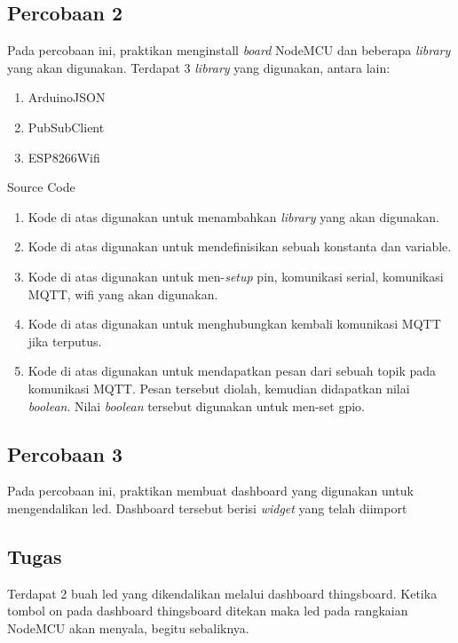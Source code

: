 \documentclass{class}
\begin{document}
    \subsection{Percobaan 2}
    Pada percobaan ini, praktikan menginstall \emph{board} NodeMCU dan beberapa \emph{library} yang akan digunakan.
    Terdapat 3 \emph{library} yang digunakan, antara lain:
    \begin{enumerate}
      \item ArduinoJSON
      \item PubSubClient
      \item ESP8266Wifi
    \end{enumerate}
    Source Code
    \begin{enumerate}
      \item 
      Kode di atas digunakan untuk menambahkan \emph{library} yang akan digunakan. \\
      \item 
      Kode di atas digunakan untuk mendefinisikan sebuah konstanta dan variable. \\
      \item 
      Kode di atas digunakan untuk men-\emph{setup} pin, komunikasi serial, komunikasi MQTT, wifi yang akan digunakan. \\
      \item 
      Kode di atas digunakan untuk menghubungkan kembali komunikasi MQTT jika terputus.
      \item 
      Kode di atas digunakan untuk mendapatkan pesan dari sebuah topik pada komunikasi MQTT. 
      Pesan tersebut diolah, kemudian didapatkan nilai \emph{boolean}.
      Nilai \emph{boolean} tersebut digunakan untuk men-set gpio. \\
    \end{enumerate}
    
    \subsection{Percobaan 3}
    Pada percobaan ini, praktikan membuat dashboard yang digunakan untuk mengendalikan led.
    Dashboard tersebut berisi \emph{widget} yang telah diimport

    \subsection{Tugas}
    Terdapat 2 buah led yang dikendalikan melalui dashboard thingsboard. 
    Ketika tombol on pada dashboard thingsboard ditekan maka led pada rangkaian NodeMCU akan menyala, begitu sebaliknya.
    
\end{document}
